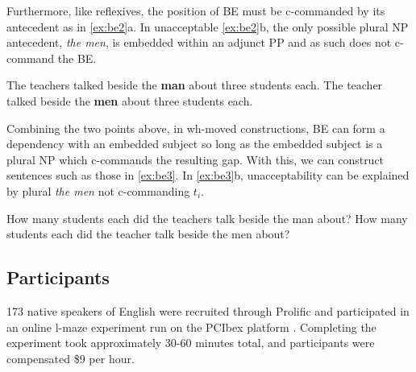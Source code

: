 \documentclass[12pt]{article}
\begin{document}
\noindent
Furthermore, like reflexives, the position of BE must be c-commanded by its antecedent as in \ref{ex:be2}a. In
unacceptable \ref{ex:be2}b, the only possible plural NP antecedent, \textit{the men}, is embedded within an adjunct PP
and as such does not c-command the BE.
\begin{exe}
    \ex \label{ex:be2}
    \begin{xlist}
        \ex The teachers talked beside the \textbf{man} about three students each.
        \ex *The teacher talked beside the \textbf{men} about three students each.
    \end{xlist}

\end{exe}

\noindent
Combining the two points above, in wh-moved constructions, BE can form a dependency with an embedded subject so long as the embedded subject is a plural NP which c-commands the resulting gap. With this, we can construct sentences such as those in \ref{ex:be3}. In \ref{ex:be3}b, unacceptability can be explained by plural \textit{the men} not c-commanding $t_i$.
\begin{exe}
    \ex \label{ex:be3}
    \begin{xlist}
        \ex How many students each did the teachers talk beside the man about?
        \ex *How many students each did the teacher talk beside the men about?
    \end{xlist}
\end{exe}

\subsection{Participants}
173 native speakers of English were recruited through Prolific and participated in an online l-maze \cite{Forster-Guerrera-Elliot2009} experiment run on the PCIbex platform \cite{Zehr-Schwarz2018}. Completing the experiment took approximately 30-60 minutes total, and participants were compensated \$9 per hour.
\end{document}
